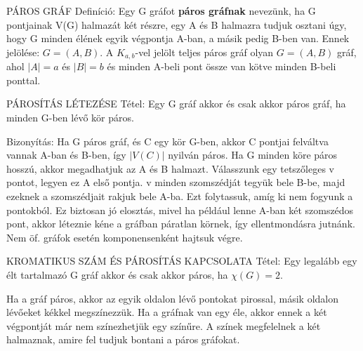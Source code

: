 \begin{definicio}{
PÁROS GRÁF Definíció}: Egy G gráfot \textbf{páros gráfnak} nevezünk, ha G pontjainak V(G) halmazát két részre, egy A és B halmazra tudjuk osztani úgy, hogy G minden élének egyik végpontja A-ban, a másik pedig B-ben van. Ennek jelölése: $G = (A,B)$. A $K_{a,b}$-vel jelölt teljes páros gráf olyan $G=(A,B)$ gráf, ahol $|A| = a$ és $|B| = b$ és minden A-beli pont össze van kötve minden B-beli ponttal.
\end{definicio}
\begin{tetel}{
PÁROSÍTÁS LÉTEZÉSE Tétel}: Egy G gráf akkor és csak akkor páros gráf, ha minden G-ben lévő kör páros.
\end{tetel}
\begin{leftbar}
Bizonyítás: Ha G páros gráf, és C egy kör G-ben, akkor C pontjai felváltva vannak A-ban és B-ben, így $|V(C)|$ nyilván páros. Ha G minden köre páros hosszú, akkor megadhatjuk az A és B halmazt. Válasszunk egy tetszőleges v pontot, legyen ez A első pontja.  v minden szomszédját tegyük bele B-be, majd ezeknek a szomszédjait rakjuk bele A-ba. Ezt folytassuk, amíg ki nem fogyunk a pontokból. Ez biztosan jó elosztás, mivel ha például lenne A-ban két szomszédos pont, akkor léteznie kéne a gráfban páratlan körnek, így ellentmondásra jutnánk. Nem öf. gráfok esetén komponensenként hajtsuk végre.
\end{leftbar}
\begin{tetel}{
KROMATIKUS SZÁM ÉS PÁROSÍTÁS KAPCSOLATA Tétel}: Egy legalább egy élt tartalmazó G gráf akkor és csak akkor páros, ha $\chi(G) = 2$.
\end{tetel}
\begin{leftbar}
Ha a gráf páros, akkor az egyik oldalon lévő pontokat pirossal, másik oldalon lévőeket kékkel megszínezzük. Ha a gráfnak van egy éle, akkor ennek a két végpontját már nem színezhetjük egy színűre. A színek megfelelnek a két halmaznak, amire fel tudjuk bontani a páros gráfokat.
\end{leftbar}
